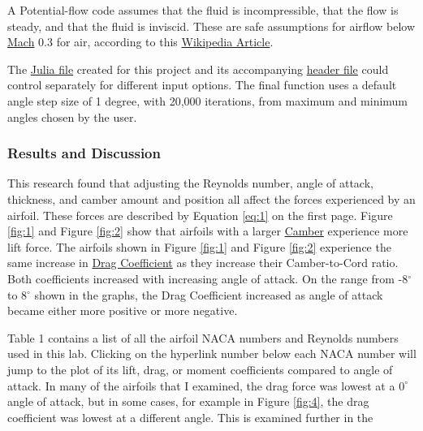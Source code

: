 \documentclass{article}
\begin{document}
A Potential-flow code assumes that the fluid is incompressible, that the flow is steady, and that the fluid is inviscid. These are safe assumptions for airflow below \hyperlink{M}{Mach} 0.3 for air, according to this \href{https://en.wikipedia.org/wiki/Compressible_flow}{Wikipedia Article}. \newline

The \href{https://github.com/JoeSpencer1/497R-Projects/blob/Airfoil-Analysis/Airfoil_Analysis.jl}{Julia file} created for this project and its accompanying \href{https://github.com/JoeSpencer1/497R-Projects/blob/Airfoil-Analysis/Airfoil_Functions.jl}{header file} could control separately for different input options. The final function uses a default angle step size of 1 degree, with 20,000 iterations, from maximum and minimum angles chosen by the user.\newline

\subsubsection*{Results and Discussion}

This research found that adjusting the Reynolds number, angle of attack, thickness, and camber amount and position all affect the forces experienced by an airfoil. These forces are described by Equation \ref{eq:1} on the first page. Figure \ref{fig:1} and Figure \ref{fig:2} show that airfoils with a larger \hyperlink{c}{Camber} experience more lift force. The airfoils shown in Figure \ref{fig:1} and Figure \ref{fig:2} experience the same increase in \hyperlink{CD}{Drag Coefficient} as they increase their Camber-to-Cord ratio. Both coefficients increased with increasing angle of attack. On the range from -8$^{\circ}$ to 8$^{\circ}$ shown in the graphs, the Drag Coefficient increased as angle of attack became either more positive or more negative.\newline

Table 1 contains a list of all the airfoil NACA numbers and Reynolds numbers used in this lab. Clicking on the \color{blue}hyperlink number \color{black} below each NACA number will jump to the plot of its lift, drag, or moment coefficients compared to angle of attack. In many of the airfoils that I examined, the drag force was lowest at a $0^{\circ}$ angle of attack, but in some cases, for example in Figure \ref{fig:4}, the drag coefficient was lowest at a different angle. This is examined further in the \newline
\end{document}
